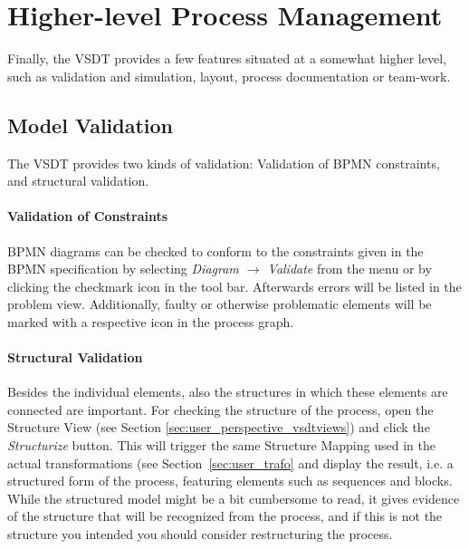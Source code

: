 \section{Higher-level Process Management}

Finally, the VSDT provides a few features situated at a somewhat higher level,
such as validation and simulation, layout, process documentation or team-work.



\subsection{Model Validation}

The VSDT provides two kinds of validation: Validation of BPMN constraints, and
structural validation.

\paragraph{Validation of Constraints}
BPMN diagrams can be checked to conform to the constraints given in the BPMN
specification by selecting \emph{Diagram $\rightarrow$ Validate} from the menu or
by clicking the checkmark icon in the tool bar.  Afterwards errors will be listed
in the problem view.  Additionally, faulty or otherwise problematic elements will
be marked with a respective icon in the process graph.

\paragraph{Structural Validation}
Besides the individual elements, also the structures in which these elements are
connected are important.  For checking the structure of the process, open the
Structure View (see Section \ref{sec:user_perspective_vsdtviews}) and click the
\emph{Structurize} button.  This will trigger the same Structure Mapping used in
the actual transformations (see Section~\ref{sec:user_trafo} and display the result,
i.e. a structured form of the process, featuring elements such as sequences and
blocks.  While the structured model might be a bit cumbersome to read, it gives
evidence of the structure that will be recognized from the process, and if this
is not the structure you intended you should consider restructuring the process.



